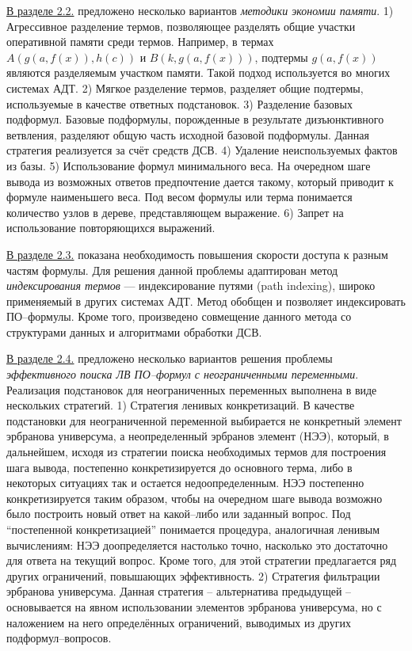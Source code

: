 \documentclass[a4paper]{report}
\begin{document}
\underline{В разделе 2.2.} предложено несколько вариантов \emph{методики экономии памяти}. 1) Агрессивное разделение термов, позволяющее разделять общие участки оперативной памяти среди термов. Например, в термах $A(g(a,f(x)),h(c))$ и $B(k,g(a,f(x)))$, подтермы $g(a,f(x))$ являются разделяемым участком памяти. Такой подход используется во многих системах АДТ. 2) Мягкое разделение термов, разделяет общие подтермы, используемые в качестве ответных подстановок. 3) Разделение базовых подформул. Базовые подформулы, порожденные в результате дизъюнктивного ветвления, разделяют общую часть исходной базовой подформулы. Данная стратегия реализуется за счёт средств ДСВ. 4) Удаление неиспользуемых фактов из базы. 5) Использование формул минимального веса. На очередном шаге вывода из возможных ответов предпочтение дается такому, который приводит к формуле наименьшего веса. Под весом формулы или терма понимается количество узлов в дереве, представляющем выражение. 6) Запрет на использование повторяющихся выражений.

\underline{В разделе 2.3.} показана необходимость повышения скорости доступа к разным частям формулы. Для решения данной проблемы адаптирован метод \emph{индексирования термов} --- индексирование путями (path indexing), широко применяемый в других системах АДТ. Метод обобщен и позволяет индексировать ПО--формулы. Кроме того, произведено совмещение данного метода со структурами данных и алгоритмами обработки ДСВ.

\underline{В разделе 2.4.} предложено несколько вариантов решения проблемы \emph{эффективного поиска ЛВ ПО--формул с неограниченными переменными}. Реализация подстановок для неограниченных переменных выполнена в виде нескольких стратегий. 1) Стратегия ленивых конкретизаций. В качестве подстановки для неограниченной переменной выбирается не конкретный элемент эрбранова универсума, а неопределенный эрбранов элемент (НЭЭ), который, в дальнейшем, исходя из стратегии поиска необходимых термов для построения шага вывода, постепенно конкретизируется до основного терма, либо в некоторых ситуациях так и остается недоопределенным. НЭЭ постепенно конкретизируется таким образом, чтобы на очередном шаге вывода возможно было построить новый ответ на какой--либо или заданный вопрос. Под ``постепенной конкретизацией'' понимается процедура, аналогичная ленивым вычислениям: НЭЭ доопределяется настолько точно, насколько это достаточно для ответа на текущий вопрос. Кроме того, для этой стратегии предлагается ряд других ограничений, повышающих эффективность.  2) Стратегия фильтрации эрбранова универсума. Данная стратегия -- альтернатива предыдущей -- основывается на явном использовании элементов эрбранова универсума, но с наложением на него определённых ограничений, выводимых из других подформул--вопросов.
\end{document}
